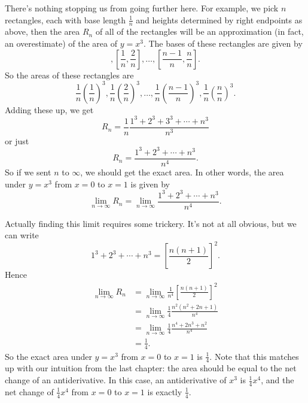 \documentclass[10pt,]{book}
\theoremstyle{ptxplainnotitle}
\theoremstyle{ptxplaintitle}
\theoremstyle{ptxplainnotitle}
\theoremstyle{ptxplaintitle}
\theoremstyle{ptxplainnotitle}
\theoremstyle{ptxplaintitle}
\theoremstyle{ptxdefinitionnotitle}
\theoremstyle{ptxdefinitiontitle}
\theoremstyle{ptxdefinitionnotitle}
\theoremstyle{ptxdefinitiontitle}
\theoremstyle{ptxdefinitionnotitle}
\theoremstyle{ptxdefinitiontitle}
\theoremstyle{ptxdefinitionnotitle}
\theoremstyle{ptxdefinitiontitle}
\theoremstyle{ptxdefinitionnotitle}
\theoremstyle{ptxdefinitiontitle}
\numberwithin{equation}{section}
\begin{document}
%
\par
\hypertarget{p-405}{}%
There's nothing stopping us from going further here. For example, we pick \(n\) rectangles, each with base length \(\frac{1}{n}\) and heights determined by right endpoints as above, then the area \(R_{n}\) of all of the rectangles will be an approximation (in fact, an overestimate) of the area of \(y = x^{3}\). The bases of these rectangles are given by%
\begin{equation*}
[0,\frac{1}{n}], [\frac{1}{n},\frac{2}{n}],\ldots,[\frac{n-1}{n},\frac{n}{n}].
\end{equation*}
So the areas of these rectangles are%
\begin{equation*}
\frac{1}{n}\left(\frac{1}{n}\right)^{3}, \frac{1}{n}\left(\frac{2}{n}\right)^{3},\ldots,\frac{1}{n}\left(\frac{n-1}{n}\right)^{3}, \frac{1}{n}\left(\frac{n}{n}\right)^{3}.
\end{equation*}
Adding these up, we get%
\begin{equation*}
R_{n} = \frac{1}{n}\frac{1^{3}+2^{3} + 3^{3} + \cdots + n^{3}}{n^{3}}
\end{equation*}
or just%
\begin{equation*}
R_{n} = \frac{1^{3} + 2^{3} + \cdots + n^{3}}{n^{4}}.
\end{equation*}
So if we sent \(n\) to \(\infty\), we should get the exact area. In other words, the area under \(y=x^{3}\) from \(x=0\) to \(x=1\) is given by%
\begin{equation*}
\lim_{n\to\infty}R_{n} = \lim_{n\to\infty}\frac{1^{3} + 2^{3} + \cdots + n^{3}}{n^{4}}.
\end{equation*}
%
\par
\hypertarget{p-406}{}%
Actually finding this limit requires some trickery. It's not at all obvious, but we can write%
\begin{equation*}
1^{3} + 2^{3} + \cdots + n^{3} = \left[\frac{n(n+1)}{2}\right]^{2}.
\end{equation*}
Hence%
\begin{align*}
\lim_{n\to\infty}R_{n} & = \lim_{n\to\infty}\frac{1}{n^{4}}\left[\frac{n(n+1)}{2}\right]^{2} \\
& = \lim_{n\to\infty}\frac{1}{4}\frac{n^{2}(n^{2}+2n+1)}{n^{4}} \\
& = \lim_{n\to\infty}\frac{1}{4}\frac{n^{4} + 2n^{3} + n^{2}}{n^{4}} \\
& = \frac{1}{4}. 
\end{align*}
So the exact area under \(y = x^{3}\) from \(x=0\) to \(x=1\) is \(\frac{1}{4}\). Note that this matches up with our intuition from the last chapter: the area should be equal to the net change of an antiderivative. In this case, an antiderivative of \(x^{3}\) is \(\frac{1}{4}x^{4}\), and the net change of \(\frac{1}{4}x^{4}\) from \(x=0\) to \(x=1\) is exactly \(\frac{1}{4}\).%
\end{document}
